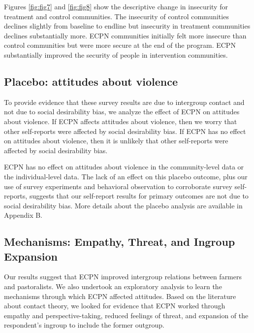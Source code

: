 \documentclass[11pt]{article}
\begin{document}
Figures \ref{fig:fig7} and \ref{fig:fig8} show the descriptive change in
insecurity for treatment and control communities. The insecurity of
control communities declines slightly from baseline to endline but
insecurity in treatment communities declines substantially more. ECPN
communities initially felt more insecure than control communities but
were more secure at the end of the program. ECPN substantially improved
the security of people in intervention communities.

\hypertarget{placebo-attitudes-about-violence}{%
\subsection{Placebo: attitudes about
violence}\label{placebo-attitudes-about-violence}}

To provide evidence that these survey results are due to intergroup
contact and not due to social desirability bias, we analyze the effect
of ECPN on attitudes about violence. If ECPN affects attitudes about
violence, then we worry that other self-reports were affected by social
desirability bias. If ECPN has no effect on attitudes about violence,
then it is unlikely that other self-reports were affected by social
desirability bias.

ECPN has no effect on attitudes about violence in the community-level
data or the individual-level data. The lack of an effect on this placebo
outcome, plus our use of survey experiments and behavioral observation
to corroborate survey self-reports, suggests that our self-report
results for primary outcomes are not due to social desirability bias.
More details about the placebo analysis are available in Appendix B.

\hypertarget{mechanisms-empathy-threat-and-ingroup-expansion}{%
\subsection{Mechanisms: Empathy, Threat, and Ingroup
Expansion}\label{mechanisms-empathy-threat-and-ingroup-expansion}}

Our results suggest that ECPN improved intergroup relations between
farmers and pastoralists. We also undertook an exploratory analysis to
learn the mechanisms through which ECPN affected attitudes. Based on the
literature about contact theory, we looked for evidence that ECPN worked
through empathy and perspective-taking, reduced feelings of threat, and
expansion of the respondent's ingroup to include the former outgroup.
\end{document}
